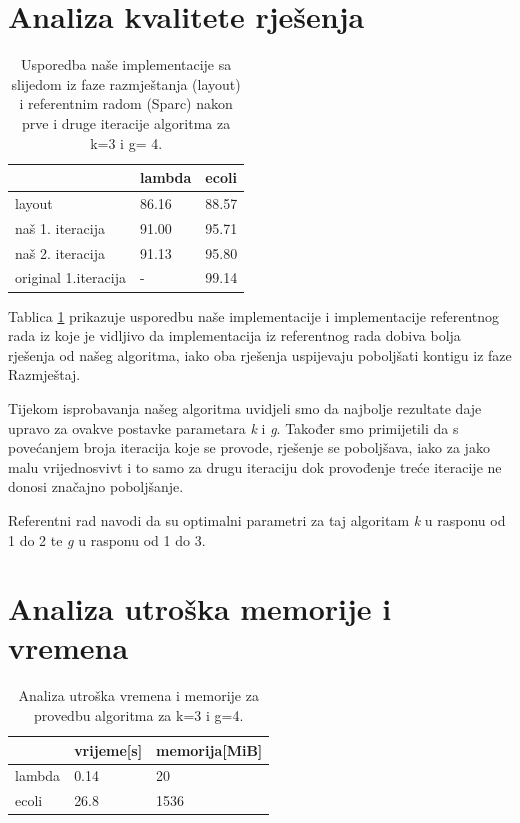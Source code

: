 \documentclass[times, utf8, seminar, numeric]{fer}
\begin{document}
\section{Analiza kvalitete rješenja}
\begin{table}[htb]
	\centering
	\begin{tabular}{l|ll}
		& \multicolumn{1}{l}{lambda} & ecoli \\ 	\hline
		layout 					& 86.16 	& 88.57 \\ 	\hline
		naš 1. iteracija  		& 91.00     & 95.71 \\	\hline
		naš 2. iteracija  		& 91.13     & 95.80 \\	\hline
		original 1.iteracija   	&    - 	  	& 99.14 \\ 
	\end{tabular}
	\caption{Usporedba naše implementacije sa slijedom iz faze razmještanja (layout) i referentnim radom (Sparc) nakon prve i druge iteracije algoritma za k=3 i g= 4.}
	\label{table:kvaliteta}
\end{table}

Tablica \ref{table:kvaliteta} prikazuje usporedbu naše implementacije i implementacije referentnog rada iz koje je vidljivo da implementacija iz referentnog rada dobiva bolja rješenja od našeg algoritma, iako oba rješenja uspijevaju poboljšati kontigu iz faze Razmještaj.

Tijekom isprobavanja našeg algoritma uvidjeli smo da najbolje rezultate daje upravo za ovakve postavke parametara \emph{k} i \emph{g}. Također smo primijetili da s povećanjem broja iteracija koje se provode, rješenje se poboljšava, iako za jako malu vrijednosvivt i to samo za drugu iteraciju dok provođenje treće iteracije ne donosi značajno poboljšanje.

Referentni rad navodi da su optimalni parametri za taj algoritam \emph{k} u rasponu od 1 do 2 te \emph{g} u rasponu od 1 do 3. 

\section{Analiza utroška memorije i vremena}
\begin{table}[htb]
	\centering
	\begin{tabular}{l|ll}
		& \multicolumn{1}{l}{vrijeme[s]} & memorija[MiB] \\ 	\hline
		lambda			& 0.14		& 20 	\\ 	\hline
		ecoli  			& 26.8     & 1536  \\	\hline
	\end{tabular}
	\caption{Analiza utroška vremena i memorije za provedbu algoritma za k=3 i g=4.}
	\label{table:memorija}
\end{table}
\end{document}
